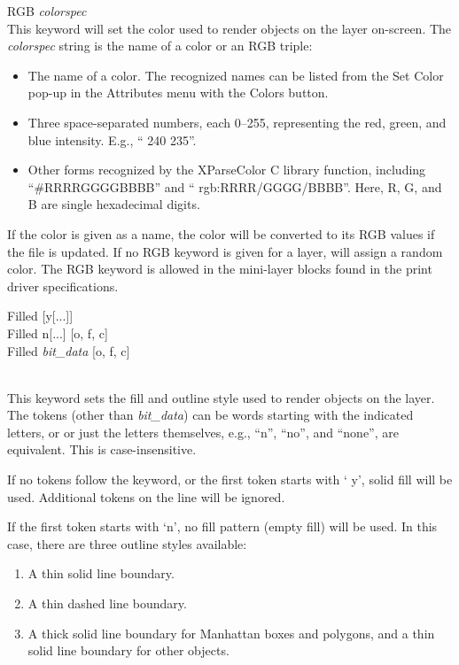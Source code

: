 \begin{description}
\item{\vt RGB} {\it colorspec}\\
This keyword will set the color used to render objects on the layer
on-screen.  The {\it colorspec} string is the name of a color or an
RGB triple:
\begin{itemize}
\item{The name of a color.  The recognized names can be listed from
   the {\cb Set Color} pop-up in the {\cb Attributes} menu with the {\cb
   Colors} button.}
\item{Three space-separated numbers, each 0--255, representing the
   red, green, and blue intensity.  E.g., ``{ 240 235}''.}
\item{Other forms recognized by the {\vt XParseColor} C library
   function, including ``{\vt \#RRRRGGGGBBBB}'' and ``{\vt
   rgb:RRRR/GGGG/BBBB}''.  Here, {\vt R}, {\vt G}, and {\vt B} are
   single hexadecimal digits.}

\end{itemize}
If the color is given as a name, the color will be converted to its
RGB values if the file is updated.  If no {\vt RGB} keyword is given
for a layer, {\Xic} will assign a random color.  The {\vt RGB} keyword
is allowed in the mini-layer blocks found in the print driver
specifications.

\item\parbox[b]{4in}{
{\vt Filled} [{\vt y}[...]]\\
{\vt Filled} {\vt n}[...] [{\vt o, f, c}]\\
{\vt Filled} {\it bit\_data\/} [{\vt o, f, c}]
}\\
This keyword sets the fill and outline style used to render objects on
the layer.  The tokens (other than {\it bit\_data}) can be words
starting with the indicated letters, or or just the letters
themselves, e.g., ``{\vt n}'', ``{\vt no}'', and ``{\vt none}'', are
equivalent.  This is case-insensitive.

If no tokens follow the keyword, or the first token starts with `{\vt
y}', solid fill will be used.  Additional tokens on the line will be
ignored.

If the first token starts with `{\vt n}', no fill pattern (empty fill)
will be used.  In this case, there are three outline styles available:
\begin{enumerate}
\item{A thin solid line boundary.}
\item{A thin dashed line boundary.}
\item{A thick solid line boundary for Manhattan boxes and polygons,    
and a thin solid line boundary for other objects.}
\end{enumerate}


\end{description}
